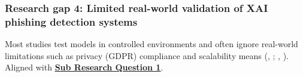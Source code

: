 
\subsubsection*{Research gap 4: Limited real-world validation of XAI phishing detection systems}\label{research-gap-4}
Most studies test models in controlled environments and often ignore real-world limitations such as privacy (GDPR) compliance and scalability means (\citeauthor{kapoor2024comparative}, \citeyear{kapoor2024comparative}; \citeauthor{atlam2022business}, \citeyear{atlam2022business}). Aligned with \hyperref[sub-research-q1]{\uline{\textbf{Sub Research Question 1}}}.

